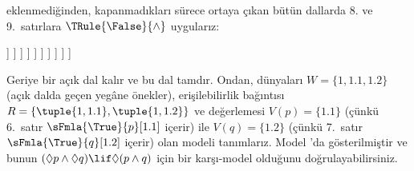 {\begin{ex}
  eklenmediğinden, kapanmadıkları sürece ortaya çıkan bütün dallarda 8. ve
  9.~satırlara $\TRule{\False}{\land}$ uygularız:
  \begin{oltableau}
    [\pFmla{\False}{(\Diamond p \land \Diamond q) \lif \Diamond(p \land q)}{1},
      just = \TAss, checked
      [\pFmla{\True}{\Diamond p \land \Diamond q}{1},
        just = {\TRule{\False}{\lif}[1]}, checked
        [\pFmla{\False}{\Diamond(p \land q)}{1},
          just = {\TRule{\False}{\lif}[1]}
          [\pFmla{\True}{\Diamond p}{1},
            just = {\TRule{\True}{\land}[2]}, checked
            [\pFmla{\True}{\Diamond q}{1},
              just = {\TRule{\True}{\land}[2]}, checked
              [\pFmla{\True}{p}{1.1}, 
                just = {\TRule{\True}{\Diamond}[4]}, checked
                [\pFmla{\True}{q}{1.2}, 
                  just = {\TRule{\True}{\Diamond}[5]}, checked
                  [\pFmla{\False}{p \land q}{1.1}, 
                    just = {\TRule{\False}{\Diamond}[3]}, checked
                    [\pFmla{\False}{p \land q}{1.2}, 
                      just = {\TRule{\False}{\Diamond}[3]}, checked
                      [\pFmla{\False}{p}{1.1},
                        just = {\TRule{\False}{\land}[8]}, checked, close
                      ]
                      [\pFmla{\False}{q}{1.1},
                        just = {\TRule{\False}{\land}[8]}, checked
                        [\pFmla{\False}{p}{1.2},
                          just = {\TRule{\False}{\land}[9]}, checked]
                        [\pFmla{\False}{q}{1.2},
                          just = {\TRule{\False}{\land}[9]}, checked, close]
                      ]
                    ]
                  ]
                ]
              ]
            ]
          ]
        ]
      ]
    ]
  \end{oltableau}
  Geriye bir açık dal kalır ve bu dal tamdır. Ondan, dünyaları
  $W = \{1, 1.1, 1.2\}$ (açık dalda geçen yegâne önekler), erişilebilirlik
  bağıntısı $R = \{\tuple{1, 1.1}, \tuple{1, 1.2}\}$ ve değerlemesi
  $V(p)=\{1.1\}$ (çünkü 6.~satır $\sFmla{\True}{p}[1.1]$ içerir) ile
  $V(q)=\{1.2\}$ (çünkü 7.~satır $\sFmla{\True}{q}[1.2]$ içerir) olan modeli
  tanımlarız. Model 'da gösterilmiştir ve bunun
  $(\Diamond p \land \Diamond q) \lif \Diamond (p \land q)$ için bir
  karşı-model olduğunu doğrulayabilirsiniz.
  \begin{figure}
  \begin{center}
\end{center}
\end{figure}
\end{ex}}

